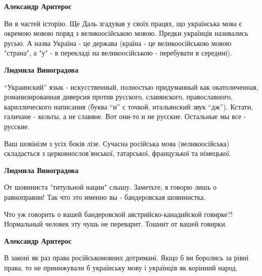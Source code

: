 \begin{itemize}
\begin{itemize}

\textbf{Александр Аритерос} 

Ви в частей історію. Ще Даль згадував у своїх
працях, що українська мова є окремою мовою поряд з великоосійською мовою.
Предки українців називались русью. А назва Україна - це держава (країна - це
великоосійською мовою "страна", а "у" - в перекладі на великоосійською -
перебувати в середині).


\textbf{Людмила Виноградова} 

\enquote{Украинский} язык - искусственный, полностью
придуманный как окатоличенная, романизированная диверсия против русского,
славянского, православного, кариллического написания (буква \enquote{и} с точкой,
итальянский звук \enquote{дж}).  Кстати, галичане - кельты, а не славяне. Вот они-то и
не русские. Остальные мы все - русские.



Ваш шовінізм з усіх боків лізе. Сучасна російська мова (великоосійська)
складається з церковнослов'янської, татарської, французької та німецької.



\textbf{Людмила Виноградова} 

От шовиниста "титульной нации" слышу. Заметьте, я говорю лишь о равноправии!
Так что это именно вы - бандеровская шовинистка.

Что уж говорить о вашей бандеровской австрийско-канадийской говирке?!
Нормальный человек эту чушь не переварит. Тошнит от вашей говирки.


\textbf{Александр Аритерос} 

В законі як раз права російськомовних дотримані. Якщо б ви боролись за рівні
права, то не принижували б українську мову і українців як корінний народ.






\end{itemize}
\end{itemize}
